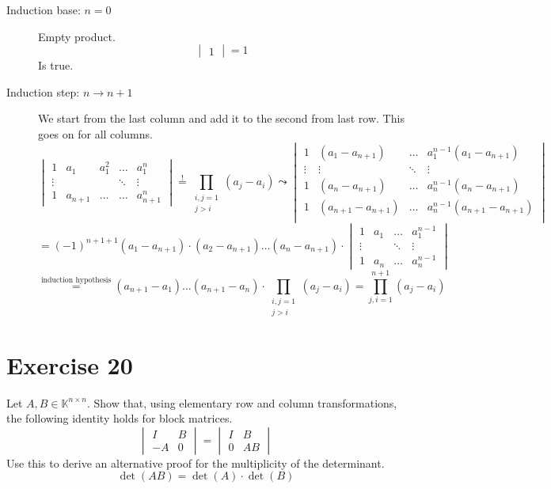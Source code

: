\documentclass[a4paper]{article}
\theoremstyle{definition}
\begin{document}
\begin{description}
  \item[Induction base: $n = 0$]
    Empty product.
    \[ \begin{vmatrix} 1 \end{vmatrix} = 1 \]
    Is true.
  \item[Induction step: $n \to n+1$]
    We start from the last column and add it to the second from last row.
    This goes on for all columns.
    \[
      \begin{vmatrix}
        1 & a_1 & a_1^2 & \ldots & a_1^n \\
        \vdots & & & \ddots & \vdots \\
        1 & a_{n+1} & \ldots & \ldots & a_{n+1}^n
      \end{vmatrix}
      \stackrel{!}{=}
      \prod_{\substack{i,j = 1 \\ j > i}} (a_j - a_i)
      \leadsto
      \begin{vmatrix}
        1 & (a_1 - a_{n+1}) & \ldots & a_1^{n-1}(a_1 - a_{n+1}) \\
        \vdots & \vdots & \ddots & \vdots \\
        1 & (a_n - a_{n+1}) & \ldots & a_n^{n-1} (a_n - a_{n+1}) \\
        1 & (a_{n+1} - a_{n+1}) & \ldots & a_n^{n-1} (a_{n+1} - a_{n+1}) \\
      \end{vmatrix}
    \] \[
      = (-1)^{n+1+1} (a_1 - a_{n+1}) \cdot (a_2 - a_{n+1}) \ldots (a_n - a_{n+1}) \cdot
      \begin{vmatrix}
        1 & a_1 & \ldots & a_1^{n-1} \\
        \vdots &  & \ddots & \vdots \\
        1 & a_n & \ldots & a_n^{n-1}
      \end{vmatrix}
    \] \[
      \overset{\text{induction hypothesis}}{=} (a_{n+1} - a_1) \ldots (a_{n+1} - a_n) \cdot \prod_{\substack{i,j = 1 \\ j > i}} (a_j - a_i) = \prod_{j,i=1}^{n+1} (a_j - a_i)
    \]
\end{description}

\section{Exercise 20}
\begin{ex}
  Let $A,B \in \mathbb K^{n \times n}$. Show that, using elementary row and column transformations,
  the following identity holds for block matrices.
  \[
    \begin{vmatrix}
      I & B \\
      -A & 0
    \end{vmatrix}
    =
    \begin{vmatrix}
      I & B \\
      0 & AB
    \end{vmatrix}
  \]
  Use this to derive an alternative proof for the multiplicity of the determinant.
  \[ \det(AB) = \det(A) \cdot \det(B) \]
\end{ex}
\end{document}
